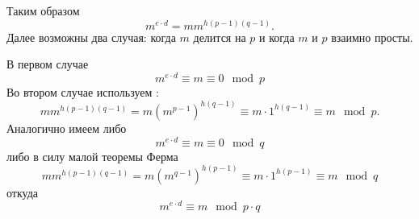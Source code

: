 Таким образом
\[
m^{e\cdot d} =m m^{h \left(p - 1\right)\left(q - 1\right)}.
\]
Далее возможны два случая: когда $m$ делится на $p$ и когда $m$ и $p$
взаимно просты.

В первом случае 
\[
m^{e\cdot d} \equiv m \equiv 0 \mod{p}
\]
Во втором случае используем
:
\[
m m^{h \left(p - 1\right)\left(q - 1\right)} 
= m \left(m^{p - 1}\right)^{h \left(q - 1\right)} \equiv m \cdot 1^{h
  \left(q - 1\right)} \equiv m \mod{p}.
\]
Аналогично имеем либо
\[
m^{e\cdot d} \equiv m \equiv 0 \mod{q}
\]
либо в силу малой теоремы Ферма
\[
m m^{h \left(p - 1\right)\left(q - 1\right)} 
= m \left(m^{q - 1}\right)^{h \left(p - 1\right)} \equiv m \cdot 1^{h
  \left(p - 1\right)} \equiv m \mod{q}
\]
откуда
\[
m^{e\cdot d} \equiv m \mod{p \cdot q}
\]
